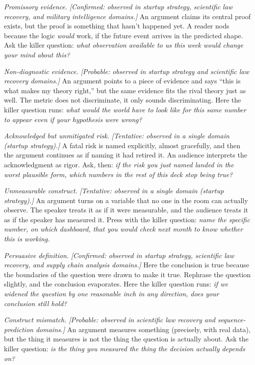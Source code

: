 \documentclass[
  11pt,
]{article}
\begin{document}
\emph{Promissory evidence.} \emph{{[}Confirmed: observed in startup
strategy, scientific law recovery, and military intelligence
domains.{]}} An argument claims its central proof exists, but the proof
is something that hasn't happened yet. A reader nods because the logic
\emph{would} work, if the future event arrives in the predicted shape.
Ask the killer question: \emph{what observation available to us this week
would change your mind about this?}

\emph{Non-diagnostic evidence.} \emph{{[}Probable: observed in startup
strategy and scientific law recovery domains.{]}} An argument points to a
piece of evidence and says ``this is what makes my theory right,'' but
the same evidence fits the rival theory just as well. The metric does not
discriminate, it only sounds discriminating. Here the killer question
runs: \emph{what would the world have to look like for this same number
to appear even if your hypothesis were wrong?}

\emph{Acknowledged but unmitigated risk.} \emph{{[}Tentative: observed in
a single domain (startup strategy).{]}} A fatal risk is named explicitly,
almost gracefully, and then the argument continues as if naming it had
retired it. An audience interprets the acknowledgment as rigor. Ask,
then: \emph{if the risk you just named landed in the worst plausible
form, which numbers in the rest of this deck stop being true?}

\emph{Unmeasurable construct.} \emph{{[}Tentative: observed in a single
domain (startup strategy).{]}} An argument turns on a variable that no
one in the room can actually observe. The speaker treats it as if it were
measurable, and the audience treats it as if the speaker has measured it.
Press with the killer question: \emph{name the specific number, on which
dashboard, that you would check next month to know whether this is
working.}

\emph{Persuasive definition.} \emph{{[}Confirmed: observed in
startup strategy, scientific law recovery, and supply chain analysis
domains.{]}} Here the conclusion is true because the boundaries of the
question were drawn to make it true. Rephrase the question slightly, and
the conclusion evaporates. Here the killer question runs: \emph{if we
widened the question by one reasonable inch in any direction, does your
conclusion still hold?}

\emph{Construct mismatch.} \emph{{[}Probable: observed in scientific
law recovery and sequence-prediction domains.{]}} An argument measures
something (precisely, with real data), but the thing it
measures is not the thing the question is actually about. Ask the killer
question: \emph{is the thing you measured the thing the decision actually
depends on?}
\end{document}
